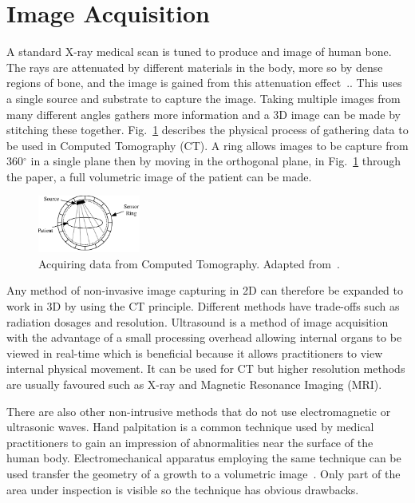 \documentclass[journal]{IEEEtran}
\begin{document}
\section{Image Acquisition}
\label{sec:image}

A standard X-ray medical scan is tuned to produce and image of human bone.
The rays are attenuated by different materials in the body, more so by dense regions of bone, and the image is gained from this attenuation effect~\cite{kayvan2006biomedical}..  
This uses a single source and substrate to capture the image.
Taking multiple images from many different angles gathers more information and a 3D image can be made by stitching these together.
Fig.~\ref{fig:ct} describes the physical process of gathering data to be used in Computed Tomography (CT).
A ring allows images to be capture from 360$^{\circ}$ in a single plane then by moving in the orthogonal plane, in Fig.~\ref{fig:ct} through the paper, a full volumetric image of the patient can be made. 

\begin{figure}[!htb]
   \centering
   \includegraphics[width = 0.3\textwidth]{Figures/CT.pdf}
   \caption{Acquiring data from Computed Tomography. Adapted from~\cite{kayvan2006biomedical}.}
   \label{fig:ct}
\end{figure}

Any method of non-invasive image capturing in 2D can therefore be expanded to work in 3D by using the CT principle.
Different methods have trade-offs such as radiation dosages and resolution.
Ultrasound is a method of image acquisition with the advantage of a small processing overhead allowing internal organs to be viewed in real-time which is beneficial because it allows practitioners to view internal physical movement. 
It can be used for CT but higher resolution methods are usually favoured such as X-ray and Magnetic Resonance Imaging (MRI).

There are also other non-intrusive methods that do not use electromagnetic or ultrasonic waves.
Hand palpitation is a common technique used by medical practitioners to gain an impression of abnormalities near the surface of the human body. 
Electromechanical apparatus employing the same technique can be used transfer the geometry of a growth to a volumetric image~\cite{liu09haptic,wellman1997modeling}.  
Only part of the area under inspection is visible so the technique has obvious drawbacks.
\end{document}
